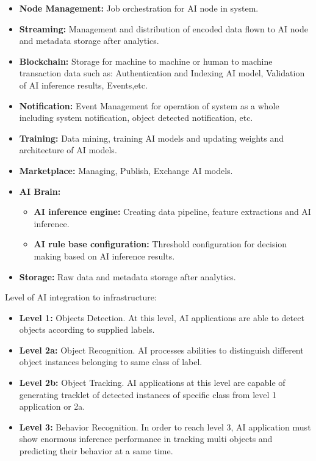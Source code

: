     \begin{itemize}
        \item \textbf{Node Management:} Job orchestration for AI node in system.
        \item \textbf{Streaming:} Management and distribution of encoded data flown to AI node and metadata storage after analytics.
        \item \textbf{Blockchain:} Storage for machine to machine or human to machine transaction data such as: Authentication and Indexing AI model, Validation 
        of AI inference results, Events,etc.
        \item \textbf{Notification:} Event Management for operation of system as a whole including system notification, object detected notification, etc.
        \item \textbf{Training:} Data mining, training AI models and updating weights and architecture of AI models.
        \item \textbf{Marketplace:} Managing, Publish, Exchange AI models.
        \item \textbf{AI Brain:}
            \begin{itemize}
                \item \textbf{AI inference engine:} Creating data pipeline, feature extractions and AI inference.
                \item \textbf{AI rule base configuration:} Threshold configuration for decision making based on AI inference results.
            \end{itemize}
        \item \textbf{Storage:} Raw data and metadata storage after analytics.
    \end{itemize}
    Level of AI integration to infrastructure:
    \begin{itemize}
        \item \textbf{Level 1:} Objects Detection. At this level, AI applications are able to detect objects according to supplied labels.
        \item \textbf{Level 2a:} Object Recognition. AI processes abilities to distinguish different object instances belonging to same class of label.
        \item \textbf{Level 2b:} Object Tracking. AI applications at this level are capable of generating tracklet of detected instances of specific 
        class from level 1 application or 2a.
        \item \textbf{Level 3:} Behavior Recognition. In order to reach level 3, AI application must show enormous inference performance in tracking 
        multi objects and predicting their behavior at a same time. 
    \end{itemize}
